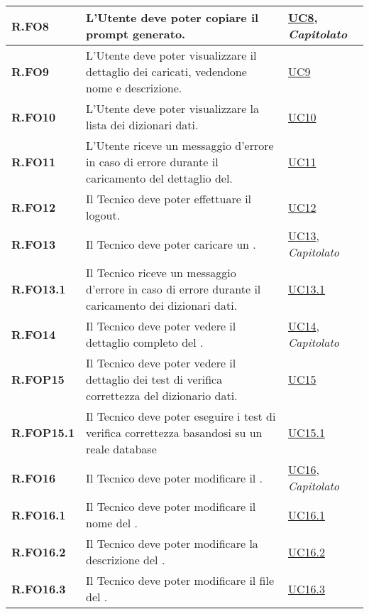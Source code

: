 \begin{longtable}{|P{3cm}|P{6,5cm}|>{\arraybackslash}P{4cm}|}
    \hline
    \textbf{R.FO8} & L’Utente  deve poter copiare il prompt generato. &  \hyperref[UC8]{UC8}, \emph{Capitolato}\\
    \hline
    \textbf{R.FO9} & L’Utente  deve poter visualizzare il dettaglio dei  caricati, vedendone nome e descrizione. &  \hyperref[UC9]{UC9}\\
    \hline
    \textbf{R.FO10} & L’Utente  deve poter visualizzare la lista dei dizionari dati. &  \hyperref[UC10]{UC10}\\
    \hline
    \textbf{R.FO11} & L’Utente  riceve un messaggio d'errore in caso di errore durante il caricamento del dettaglio del. &  \hyperref[UC11]{UC11}\\
    \hline
    \textbf{R.FO12} & Il Tecnico deve poter effettuare il logout. &  \hyperref[UC12]{UC12}\\
    \hline
    \textbf{R.FO13} & Il Tecnico deve poter caricare un . &  \hyperref[UC13]{UC13}, \emph{Capitolato}\\
    \hline
    \textbf{R.FO13.1} & Il Tecnico riceve un messaggio d'errore in caso di errore durante il caricamento dei dizionari dati. &  \hyperref[UC13point1]{UC13.1}\\
    \hline
    \textbf{R.FO14} & Il Tecnico deve poter vedere il dettaglio completo del . &  \hyperref[UC14]{UC14}, \emph{Capitolato}\\
    \hline
    \textbf{R.FOP15} & Il Tecnico deve poter vedere il dettaglio dei test di verifica correttezza del dizionario dati. &  \hyperref[UC15]{UC15}\\
    \hline
    \textbf{R.FOP15.1} & Il Tecnico deve poter eseguire i test di verifica correttezza basandosi su un reale database &  \hyperref[UC15point1]{UC15.1}\\
    \hline
    \textbf{R.FO16} & Il Tecnico deve poter modificare il . &  \hyperref[UC16]{UC16}, \emph{Capitolato}\\
    \hline
    \textbf{R.FO16.1} & Il Tecnico deve poter modificare il nome del . &  \hyperref[UC16point1]{UC16.1}\\
    \hline
    \textbf{R.FO16.2} & Il Tecnico deve poter modificare la descrizione del . &  \hyperref[UC16point2]{UC16.2}\\
    \hline
    \textbf{R.FO16.3} & Il Tecnico deve poter modificare il file del . &  \hyperref[UC16point3]{UC16.3}\\

\end{longtable}
